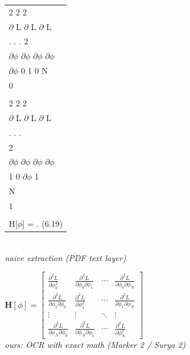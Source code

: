 \documentclass[border=8pt]{standalone}
\begin{document}
\begin{minipage}[c]{7.2cm}
\centering
\begin{tabular}{@{}>{\ttfamily\small}l@{}}
2 2 2\\
$\partial$ L $\partial$ L $\partial$ L\\
. . . 2\\
$\partial$$\phi$ $\partial$$\phi$ $\partial$$\phi$ $\partial$$\phi$\\
$\partial$$\phi$ 0 1 0 N\\
0\\
\\
2 2 2\\
$\partial$ L $\partial$ L $\partial$ L\\
. . .\\
2\\
$\partial$$\phi$ $\partial$$\phi$ $\partial$$\phi$ $\partial$$\phi$\\
1 0 $\partial$$\phi$ 1\\
N\\
1\\
\\
H[$\phi$] = . (6.19)
\end{tabular}\\[8pt]
{\scriptsize\itshape naive extraction (PDF text layer)}
\end{minipage}
\hspace{24pt}
\begin{minipage}[c]{9.5cm}
\centering
$
 \mathbf{H}[\phi] = \begin{bmatrix} \frac{\partial^2 L}{\partial \phi_0^2} & \frac{\partial^2 L}{\partial \phi_0 \partial \phi_1} &\cdots & \frac{\partial^2 L}{\partial \phi_0 \partial \phi_N} \\[2pt] \frac{\partial^2 L}{\partial \phi_1 \partial \phi_0} & \frac{\partial^2 L}{\partial \phi_1^2} & \cdots & \frac{\partial^2 L}{\partial \phi_1 \partial \phi_N} \\[2pt] \vdots & \vdots & \ddots & \vdots \\[2pt] \frac{\partial^2 L}{\partial \phi_N \partial \phi_0} & \frac{\partial^2 L}{\partial \phi_N \partial \phi_1} & \cdots &\frac{\partial^2 L}{\partial \phi_N^2} \end{bmatrix}
$\\[8pt]
{\scriptsize\itshape ours: OCR with exact math (Marker 2 / Surya 2)}
\end{minipage}
\end{document}
